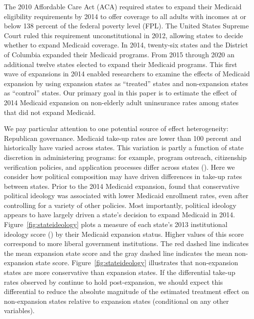 The 2010 Affordable Care Act (ACA) required states to expand their Medicaid eligibility requirements by 2014 to offer coverage to all adults with incomes at or below 138 percent of the federal poverty level (FPL). The United States Supreme Court ruled this requirement unconstitutional in 2012, allowing states to decide whether to expand Medicaid coverage. In 2014, twenty-six states and the District of Columbia expanded their Medicaid programs. From 2015 through 2020 an additional twelve states elected to expand their Medicaid programs. This first wave of expansions in 2014 enabled researchers to examine the effects of Medicaid expansion by using expansion states as ``treated'' states and non-expansion states as ``control'' states. Our primary goal in this paper is to estimate the effect of 2014 Medicaid expansion on non-elderly adult uninsurance rates among states that did not expand Medicaid. 

We pay particular attention to one potential source of effect heterogeneity: Republican governance. Medicaid take-up rates are lower than 100 percent and historically have varied across states. This variation is partly a function of state discretion in administering programs: for example, program outreach, citizenship verification policies, and application processes differ across states (\cite{courtemanche2017early}). Here we consider how political composition may have driven differences in take-up rates between states. Prior to the 2014 Medicaid expansion, \cite{sommers2012understanding} found that conservative political ideology was associated with lower Medicaid enrollment rates, even after controlling for a variety of other policies. Most importantly, political ideology appears to have largely driven a state's decision to expand Medicaid in 2014. Figure~\ref{fig:stateideology} plots a measure of each state's 2013 institutional ideology score (\cite{berry1998measuring}) by their Medicaid expansion status. Higher values of this score correspond to more liberal government institutions. The red dashed line indicates the mean expansion state score and the gray dashed line indicates the mean non-expansion state score. Figure~\ref{fig:stateideology} illustrates that non-expansion states are more conservative than expansion states. If the differential take-up rates observed by \cite{sommers2012understanding} continue to hold post-expansion, we should expect this differential to reduce the absolute magnitude of the estimated treatment effect on non-expansion states relative to expansion states (conditional on any other variables).


